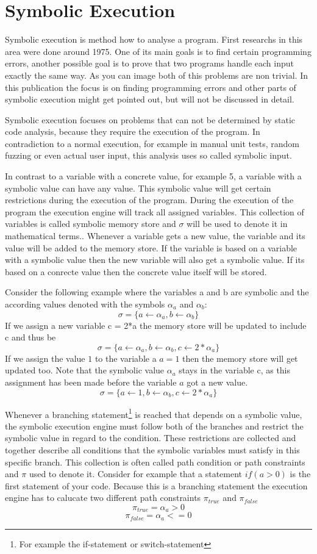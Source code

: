\section{Symbolic Execution}
Symbolic execution is method how to analyse a program. First researchs in this area were done around 1975. One of its main goals is to find certain programming errors, another possible goal is to prove that two programs handle each input exactly the same way. As you can image both of this problems are non trivial. In this publication the focus is on finding programming errors and other parts of symbolic execution might get pointed out, but will not be discussed in detail. 

Symbolic execution focuses on problems that can not be determined by static code analysis, because they require the execution of the program. In contradiction to a normal execution, for example in manual unit tests, random fuzzing or even actual user input, this analysis uses so called symbolic input.

In contrast to a variable with a concrete value, for example 5, a variable with a symbolic value can have any value. This symbolic value will get certain restrictions during the execution of the program. During the execution of the program the execution engine will track all assigned variables. This collection of variables is called symbolic memory store and $\sigma$ will be used to denote it in mathematical terms.\cite{SurveySymExec-CSUR18}.
Whenever a variable gets a new value, the variable and its value will be added to the memory store. If the variable is based on a variable with a symbolic value then the new variable will also get a symbolic value. If its based on a conrecte value then the concrete value itself will be stored.

Consider the following example where the variables a and b are symbolic and the according values denoted with the symbols $\alpha_a$ and $\alpha_b$:
$$\sigma = \{a\gets \alpha_a , b \gets \alpha_b\}$$
If we assign a new variable c = 2*a the memory store will be updated to include c and thus be
$$\sigma = \{a\gets \alpha_a , b \gets \alpha_b, c \gets 2*\alpha_a\}$$
If we assign the value $1$ to the variable a $a = 1$ then the memory store will get updated too. Note that the symbolic value $\alpha_a$ stays in the variable c, as this assignment has been made before the variable $a$ got a new value.
$$\sigma = \{a\gets 1, b \gets \alpha_b, c \gets 2*\alpha_a\}$$


Whenever a branching statement\footnote{For example the if-statement or switch-statement} is reached that depends on a symbolic value, the symbolic execution engine must follow both of the branches and restrict the symbolic value in regard to the condition. These restrictions are collected and together describe all conditions that the symbolic variables must satisfy in this specific branch. This collection is often called path condition or path constraints and $\pi$ used to denote it\cite{SurveySymExec-CSUR18}.
Consider for example that a statement $if (a > 0)$ is the first statement of your code. Because this is a branching statement the execution engine has to calucate two different path constraints $\pi_{true}$ and $\pi_{false}$
$$\pi_{true} = \alpha_a > 0$$
$$\pi_{false} = \alpha_a <= 0$$

